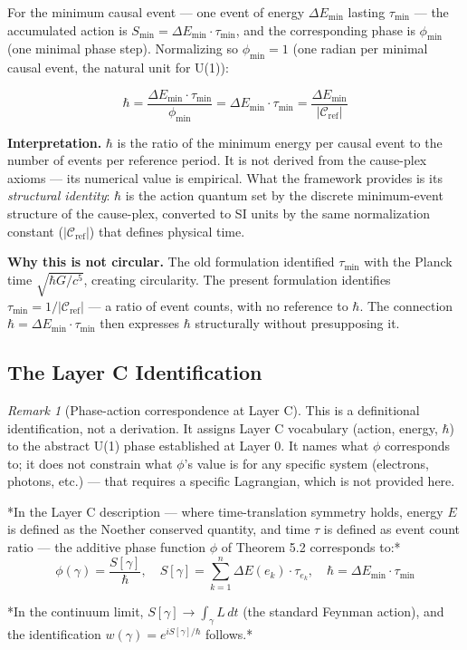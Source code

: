 \documentclass[11pt]{article}
\theoremstyle{definition}
\theoremstyle{remark}
\newtheorem{remark}[theorem]{Remark}
\begin{document}
For the minimum causal event --- one event of energy \(\Delta E_{\min}\)
lasting \(\tau_{\min}\) --- the accumulated action is
\(S_{\min} = \Delta E_{\min} \cdot \tau_{\min}\), and the corresponding
phase is \(\phi_{\min}\) (one minimal phase step). Normalizing so
\(\phi_{\min} = 1\) (one radian per minimal causal event, the natural
unit for U(1)):

\[\hbar = \frac{\Delta E_{\min} \cdot \tau_{\min}}{\phi_{\min}} = \Delta E_{\min} \cdot \tau_{\min} = \frac{\Delta E_{\min}}{|\mathcal{C}_{\text{ref}}|}\]

\textbf{Interpretation.} \(\hbar\) is the ratio of the minimum energy
per causal event to the number of events per reference period. It is not
derived from the cause-plex axioms --- its numerical value is empirical.
What the framework provides is its \emph{structural identity}: \(\hbar\)
is the action quantum set by the discrete minimum-event structure of the
cause-plex, converted to SI units by the same normalization constant
(\(|\mathcal{C}_{\text{ref}}|\)) that defines physical time.

\textbf{Why this is not circular.} The old formulation identified
\(\tau_{\min}\) with the Planck time \(\sqrt{\hbar G/c^5}\), creating
circularity. The present formulation identifies
\(\tau_{\min} = 1/|\mathcal{C}_{\text{ref}}|\) --- a ratio of event
counts, with no reference to \(\hbar\). The connection
\(\hbar = \Delta E_{\min} \cdot \tau_{\min}\) then expresses \(\hbar\)
structurally without presupposing it.

\subsection{The Layer C
Identification}\label{the-layer-c-identification}

\begin{remark}[Phase-action correspondence at Layer C]
\label{remark:6-2}
This is a definitional identification, not a derivation. It assigns Layer C vocabulary (action, energy, $\hbar$) to the abstract U(1) phase established at Layer 0. It names what $\phi$ corresponds to; it does not constrain what $\phi$'s value is for any specific system (electrons, photons, etc.) — that requires a specific Lagrangian, which is not provided here.

*In the Layer C description — where time-translation symmetry holds, energy $E$ is defined as the Noether conserved quantity, and time $\tau$ is defined as event count ratio — the additive phase function $\phi$ of Theorem 5.2 corresponds to:*
$$\phi(\gamma) = \frac{S[\gamma]}{\hbar}, \quad S[\gamma] = \sum_{k=1}^n \Delta E(e_k) \cdot \tau_{e_k}, \quad \hbar = \Delta E_{\min} \cdot \tau_{\min}$$

*In the continuum limit, $S[\gamma] \to \int_\gamma L\, dt$ (the standard Feynman action), and the identification $w(\gamma) = e^{iS[\gamma]/\hbar}$ follows.*
\end{remark}
\end{document}
